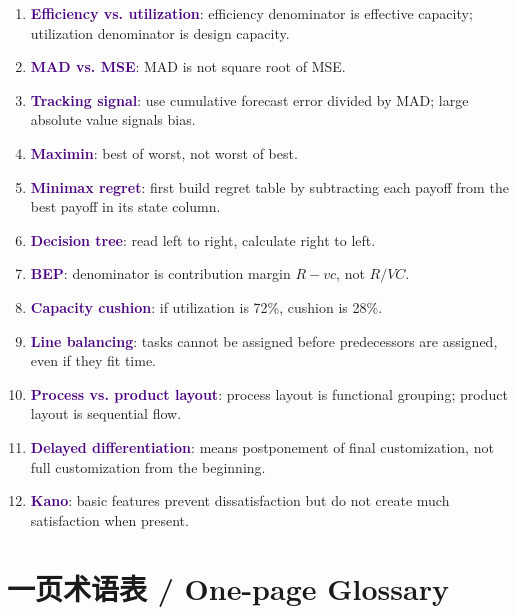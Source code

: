 \documentclass[10pt,a4paper]{ctexart}
\newcommand{\kw}[1]{\textbf{\textcolor{Indigo}{#1}}}
\begin{document}
\begin{enumerate}
  \item \kw{Efficiency vs. utilization}: efficiency denominator is effective capacity; utilization denominator is design capacity.
  \item \kw{MAD vs. MSE}: MAD is not square root of MSE.
  \item \kw{Tracking signal}: use cumulative forecast error divided by MAD; large absolute value signals bias.
  \item \kw{Maximin}: best of worst, not worst of best.
  \item \kw{Minimax regret}: first build regret table by subtracting each payoff from the best payoff in its state column.
  \item \kw{Decision tree}: read left to right, calculate right to left.
  \item \kw{BEP}: denominator is contribution margin $R-vc$, not $R/VC$.
  \item \kw{Capacity cushion}: if utilization is 72\%, cushion is 28\%.
  \item \kw{Line balancing}: tasks cannot be assigned before predecessors are assigned, even if they fit time.
  \item \kw{Process vs. product layout}: process layout is functional grouping; product layout is sequential flow.
  \item \kw{Delayed differentiation}: means postponement of final customization, not full customization from the beginning.
  \item \kw{Kano}: basic features prevent dissatisfaction but do not create much satisfaction when present.
\end{enumerate}

\section{一页术语表 / One-page Glossary}
\label{sec:glossary}
\end{document}
